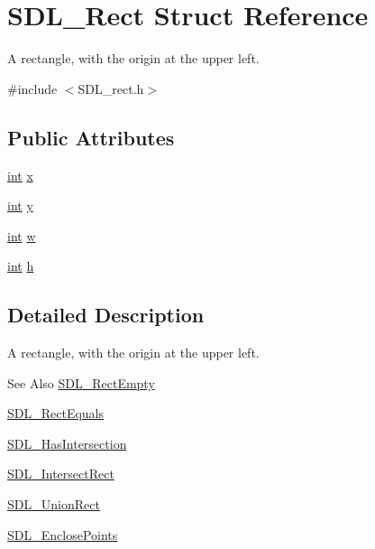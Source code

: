 \hypertarget{struct_s_d_l___rect}{\section{S\-D\-L\-\_\-\-Rect Struct Reference}
\label{struct_s_d_l___rect}
}


A rectangle, with the origin at the upper left.  




{\ttfamily \#include $<$S\-D\-L\-\_\-rect.\-h$>$}

\subsection*{Public Attributes}
\begin{DoxyCompactItemize}
\item 
\hyperlink{_s_d_l__thread_8h_a6a64f9be4433e4de6e2f2f548cf3c08e}{int} \hyperlink{struct_s_d_l___rect_a85418d94621dd6855805c4b5c7bf6482}{x}
\item 
\hyperlink{_s_d_l__thread_8h_a6a64f9be4433e4de6e2f2f548cf3c08e}{int} \hyperlink{struct_s_d_l___rect_a822694af8ddca5fd0d5d94e47106ab85}{y}
\item 
\hyperlink{_s_d_l__thread_8h_a6a64f9be4433e4de6e2f2f548cf3c08e}{int} \hyperlink{struct_s_d_l___rect_a56b7be5738fb6fab86881534a814c45e}{w}
\item 
\hyperlink{_s_d_l__thread_8h_a6a64f9be4433e4de6e2f2f548cf3c08e}{int} \hyperlink{struct_s_d_l___rect_a0a17d46b320af8063b746153348edd72}{h}
\end{DoxyCompactItemize}


\subsection{Detailed Description}
A rectangle, with the origin at the upper left. 

\begin{DoxySeeAlso}{See Also}
\hyperlink{_s_d_l__rect_8h_aac0e9b5d3f34baec6a2cde95bb01f49c}{S\-D\-L\-\_\-\-Rect\-Empty} 

\hyperlink{_s_d_l__rect_8h_a156979fd3561cf90b87741d11057262a}{S\-D\-L\-\_\-\-Rect\-Equals} 

\hyperlink{_s_d_l__rect_8h_a191ec0b069421d4a36304b475697e847}{S\-D\-L\-\_\-\-Has\-Intersection} 

\hyperlink{_s_d_l__rect_8h_aff8e3dd3b1a25443cd7c8cf02a087290}{S\-D\-L\-\_\-\-Intersect\-Rect} 

\hyperlink{_s_d_l__rect_8h_a659f2c25335202888408c95195823f9c}{S\-D\-L\-\_\-\-Union\-Rect} 

\hyperlink{_s_d_l__rect_8h_afcbb58dbba760b9e6fdb4b5d1ece015c}{S\-D\-L\-\_\-\-Enclose\-Points} 
\end{DoxySeeAlso}


